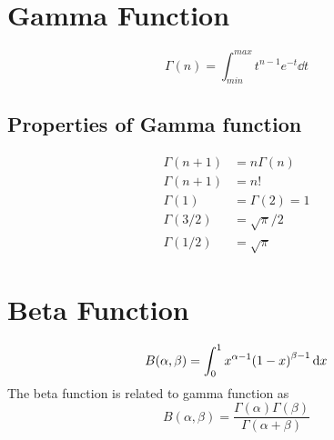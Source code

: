 \label{appendix3.gamma-beta}

\section{Gamma Function}
\begin{equation}
	\Gamma(n) = \int_{min}^{max} t^{n-1} e^{-t}\dd{t}
\end{equation}

\subsection{Properties of Gamma function}
\begin{align}
	\Gamma (n + 1) &= n \Gamma(n)\\
	\Gamma(n+1) &= n! \\
	\Gamma(1) &= \Gamma(2) = 1\\
	\Gamma(3/2) &= \sqrt{\pi}/2\\
	\Gamma(1/2) &= \sqrt{\pi}
\end{align}


\section{Beta Function}
\begin{equation}
	B(\alpha, \beta) = \int_{0}^{1} x^{\alpha - 1} \qty(1 - x)^{\beta - 1} \dd{x}
\end{equation}
The beta function is related to gamma function as
\begin{equation}
B(\alpha, \beta) = \frac{\Gamma(\alpha) \Gamma(\beta)}{\Gamma(\alpha + \beta)}
\end{equation}